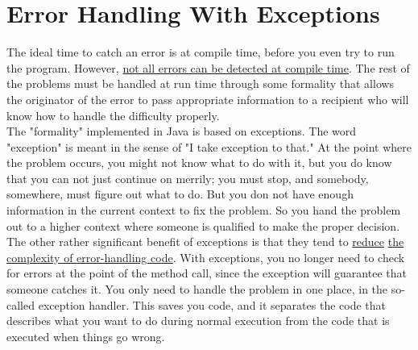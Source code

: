 \documentclass[10pt,letterpaper]{report}
\begin{document}
\chapter{Error Handling With Exceptions}

The ideal time to catch an error is at compile time, before you even try to run the program. However, \underline{not all errors can be detected at compile time}. The rest of the problems must be handled at run time through some formality that allows the originator of the error to pass appropriate information to a recipient who will know how to handle the difficulty properly.\\
The "formality" implemented in Java is based on exceptions. The word "exception" is meant in the sense of "I take exception to that." At the point where the problem occurs, you might not know what to do with it, but you do know that you can not just continue on merrily; you must stop, and somebody, somewhere, must figure out what to do. But you don not have enough information in the current context to fix the problem. So you hand the problem out to a higher context where someone is qualified to make the proper decision.\\
The other rather significant benefit of exceptions is that they tend to \underline{reduce} \underline{the complexity of error-handling code}. With exceptions, you no longer need to check for errors at the point of the method call, since the exception will guarantee that someone catches it. You only need to handle the problem in one place, in the so-called exception handler. This saves you code, and it separates the code that describes what you want to do during normal execution from the code that is executed when things go wrong.
\end{document}
